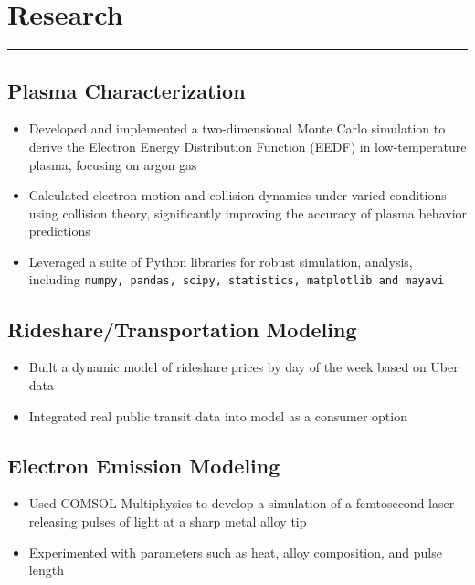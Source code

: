 \documentclass[11pt,a4paper]{article}
\newenvironment{myitemize}
{ \begin{itemize}[label={--}, leftmargin=*]
    \setlength{\itemsep}{0pt}
    \setlength{\parskip}{0pt}
    \setlength{\parsep}{0pt}     }
{ \end{itemize}                  }
\begin{document}
\section*{Research}
\vspace{-3mm} %
\hrule
\vspace{3mm} %

\subsection*{Plasma Characterization \hfill {} }

\begin{myitemize}
\item Developed and implemented a two-dimensional Monte Carlo simulation to derive the Electron Energy Distribution Function (EEDF) in low-temperature plasma, focusing on argon gas
\item Calculated electron motion and collision dynamics under varied conditions using collision theory, significantly improving the accuracy of plasma behavior predictions
\item Leveraged a suite of Python libraries for robust simulation, analysis, including \texttt{numpy, pandas, scipy, statistics, matplotlib and mayavi}
\end{myitemize}

\subsection*{Rideshare/Transportation Modeling \hfill {} }

\begin{myitemize}
\item Built a dynamic model of rideshare prices by day of the week based on Uber data
\item Integrated real public transit data into model as a consumer option
\end{myitemize}
\subsection*{Electron Emission Modeling \hfill {} }

\begin{myitemize}
\item Used COMSOL Multiphysics to develop a simulation of a femtosecond laser releasing
pulses of light at a sharp metal alloy tip
\item Experimented with parameters such as heat, alloy composition, and pulse length
\end{myitemize}
\end{document}
